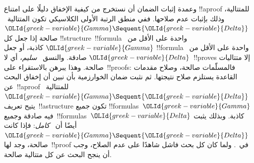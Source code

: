 \documentclass[../../../include/open-logic-section]{subfiles}
\begin{document}
وعمدة إثبات الضمان أن نستخرج من كيفية الإخفاق دليلًا على امتناع
!!a{proof} للمتتالية، وذلك بإثبات عدم صلاحها. ففي منطق الرتبة الأولى
الكلاسيكي تكون المتتالية~${\OLId{greek-variable}{Gamma}}\Sequent{\OLId{greek-variable}{Delta}}$ صالحة إذا جعل كل
!!{structure}~!!{formula} واحدة على الأقل من~${\OLId{greek-variable}{Gamma}}$ كاذبة، أو جعل
!!{formula} واحدة على الأقل من~${\OLId{greek-variable}{Delta}}$ صادقة. والنسق~
\emph{سليم}، أي لا~!!{prove}s إلا متتاليات صالحة. وهذا يبرهن بالاستقراء
على~!!{proof}s: فالمسلّمات صالحة، وصلاح مقدمات القاعدة يستلزم صلاح
نتيجتها. ثم نثبت ضمان الخوارزمية بأن نبين أن إخفاق البحث عن~!!a{proof}
للمتتالية~${\OLId{greek-variable}{Gamma}}\Sequent{\OLId{greek-variable}{Delta}}$ يتيح تعريف~!!a{structure} تكون جميع
!!{formula}s~${\OLId{greek-variable}{Gamma}}$ فيه صادقة وجميع~!!{formula}s~${\OLId{greek-variable}{Delta}}$ كاذبة.
وبذلك يثبت أيضًا أن~ \emph{كامل}: فإذا كانت
${\OLId{greek-variable}{Gamma}}\Sequent{\OLId{greek-variable}{Delta}}$ صالحة، وجد لها~!!{proof} في~. ولما كان
كل بحث فاشل شاهدًا على عدم الصلاح، وجب أن ينجح البحث عن كل متتالية صالحة.
\end{document}
